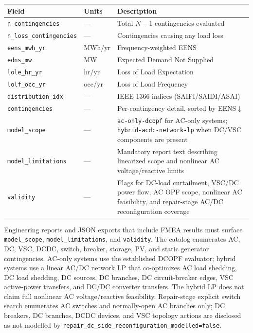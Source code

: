 \begin{center}
\begin{tabular}{lll}
\hline\hline
\textbf{Field} & \textbf{Units} & \textbf{Description} \\
\hline
\texttt{n\_contingencies} & --- & Total $N-1$ contingencies evaluated \\
\texttt{n\_loss\_contingencies} & --- & Contingencies causing any load loss \\
\texttt{eens\_mwh\_yr} & MWh/yr & Frequency-weighted EENS \\
\texttt{edns\_mw} & MW & Expected Demand Not Supplied \\
\texttt{lole\_hr\_yr} & hr/yr & Loss of Load Expectation \\
\texttt{lolf\_occ\_yr} & occ/yr & Loss of Load Frequency \\
\texttt{distribution\_idx} & --- & IEEE 1366 indices (SAIFI/SAIDI/ASAI) \\
\texttt{contingencies} & --- & Per-contingency detail, sorted by EENS$\downarrow$ \\
\texttt{model\_scope} & --- & \texttt{ac-only-dcopf} for AC-only systems; \texttt{hybrid-acdc-network-lp} when DC/VSC components are present \\
\texttt{model\_limitations} & --- & Mandatory report text describing linearized scope and nonlinear AC voltage/reactive limits \\
\texttt{validity} & --- & Flags for DC-load curtailment, VSC/DC power flow, AC OPF scope, nonlinear AC feasibility, and repair-stage AC/DC reconfiguration coverage \\
\hline\hline
\end{tabular}
\end{center}

Engineering reports and JSON exports that include FMEA results must surface
\texttt{model\_scope}, \texttt{model\_limitations}, and \texttt{validity}.  The
catalog enumerates AC, DC, VSC, DCDC, switch, breaker, storage, PV, and static
generator contingencies.  AC-only systems use the established DCOPF evaluator;
hybrid systems use a linear AC/DC network LP that co-optimizes AC load shedding,
DC load shedding, DC sources, DC branches, DC circuit-breaker edges, VSC
active-power transfers, and DC/DC converter transfers.  The hybrid LP does not
claim full nonlinear AC voltage/reactive feasibility.  Repair-stage explicit
switch search enumerates AC switches and normally-open AC branches only; DC
breakers, DC branches, DCDC devices, and VSC topology actions are disclosed as
not modelled by \texttt{repair\_dc\_side\_reconfiguration\_modelled=false}.

